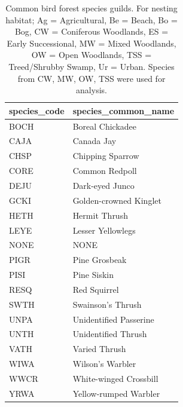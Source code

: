 \documentclass[
  letterpaper,
  DIV=11,
  numbers=noendperiod,
  oneside]{scrartcl}
\begin{document}
\hypertarget{tbl-bird-guilds}{}
\begin{table}
\caption{\label{tbl-bird-guilds}Common bird forest species guilds. For nesting habitat; Ag =
Agricultural, Be = Beach, Bo = Bog, CW = Coniferous Woodlands, ES =
Early Successional, MW = Mixed Woodlands, OW = Open Woodlands, TSS =
Treed/Shrubby Swamp, Ur = Urban. Species from CW, MW, OW, TSS were used
for analysis. }\tabularnewline

\centering
\begin{tabular}{l|l}
\hline
species\_code & species\_common\_name\\
\hline
BOCH & Boreal Chickadee\\
\hline
CAJA & Canada Jay\\
\hline
CHSP & Chipping Sparrow\\
\hline
CORE & Common Redpoll\\
\hline
DEJU & Dark-eyed Junco\\
\hline
GCKI & Golden-crowned Kinglet\\
\hline
HETH & Hermit Thrush\\
\hline
LEYE & Lesser Yellowlegs\\
\hline
NONE & NONE\\
\hline
PIGR & Pine Grosbeak\\
\hline
PISI & Pine Siskin\\
\hline
RESQ & Red Squirrel\\
\hline
SWTH & Swainson's Thrush\\
\hline
UNPA & Unidentified Passerine\\
\hline
UNTH & Unidentified Thrush\\
\hline
VATH & Varied Thrush\\
\hline
WIWA & Wilson's Warbler\\
\hline
WWCR & White-winged Crossbill\\
\hline
YRWA & Yellow-rumped Warbler\\
\hline
\end{tabular}
\end{table}
\end{document}

